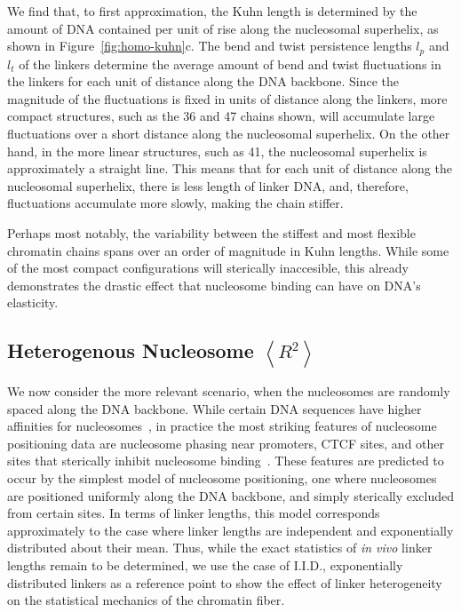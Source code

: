 \documentclass[%
 reprint,
superscriptaddress,
showpacs,preprintnumbers,
 amsmath,amssymb,
 aps,
 prl,
]{revtex4-1}
\newcommand{\RR}{\left\langle{}R^2\right\rangle{}}
\begin{document}
We find that, to first approximation, the Kuhn length is determined by the
    amount of DNA contained per unit of rise along the nucleosomal superhelix,
    as shown in Figure~\ref{fig:homo-kuhn}c.
The bend and twist persistence lengths $l_p$ and $l_t$ of the linkers determine
    the average amount of bend and twist fluctuations in the linkers for each
    unit of distance along the DNA backbone.
Since the magnitude of the fluctuations is fixed in units of distance along the
    linkers, more compact structures, such as the \SI{36}{\basepair} and
    \SI{47}{\basepair} chains shown, will accumulate large fluctuations over a
    short distance along the nucleosomal superhelix.
On the other hand, in the more linear structures, such as \SI{41}{\basepair},
    the nucleosomal superhelix is approximately a straight line.
This means that for each unit of distance along the nucleosomal superhelix,
    there is less length of linker DNA, and, therefore, fluctuations accumulate
    more slowly, making the chain stiffer.

Perhaps most notably, the variability between the stiffest and most flexible
    chromatin chains spans over an order of magnitude in Kuhn lengths.
While some of the most compact configurations will sterically inaccesible, this
    already demonstrates the drastic effect that nucleosome binding can have on
    DNA's elasticity.

\subsection{\label{sec:homo-kuhn}Heterogenous Nucleosome $\RR$}

We now consider the more relevant scenario, when the nucleosomes are randomly
    spaced along the DNA backbone.
While certain DNA sequences have higher affinities for
    nucleosomes~\cite{something widom}, in practice the most striking features
    of nucleosome positioning data are nucleosome phasing near promoters, CTCF
    sites, and other sites that sterically inhibit nucleosome
    binding~\cite{widom1992}.
These features are predicted to occur by the simplest model of nucleosome
    positioning, one where nucleosomes are positioned uniformly along the DNA
    backbone, and simply sterically excluded from certain sites.
In terms of linker lengths, this model corresponds approximately to the case
    where linker lengths are independent and exponentially distributed about
    their mean.
Thus, while the exact statistics of \textit{in vivo} linker lengths remain to be
    determined, we use the case of I.I.D., exponentially distributed linkers as
    a reference point to show the effect of linker heterogeneity on the
    statistical mechanics of the chromatin fiber.
\end{document}
